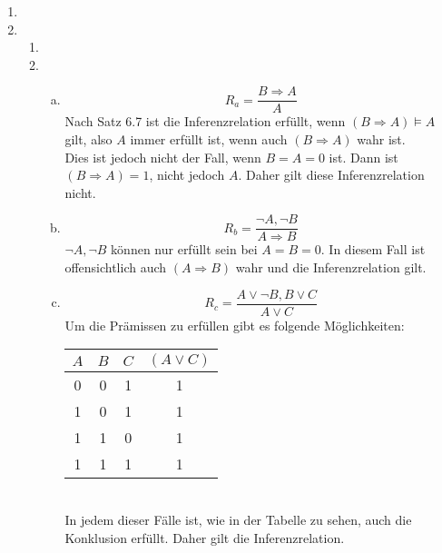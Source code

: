 \documentclass[a4paper,10pt]{scrartcl}
\title{\titleinfo}
\author{Arne Feil}
\date{\today}
\newcommand{\aufgabe}[1]{\item[\textbf{#1}]}
\begin{document}
\begin{enumerate}
\aufgabe{7.3}

\aufgabe{7.4}

\begin{enumerate}[1.]
 \item

 \item
  \begin{enumerate}[a)]
   \item
    $$R_a=\frac{B\Rightarrow A}{A}$$
    Nach Satz 6.7 ist die Inferenzrelation erfüllt, wenn $(B\Rightarrow A)\vDash A$ gilt, also $A$ immer erfüllt ist, wenn auch $(B\Rightarrow A)$ wahr ist.\\
    Dies ist jedoch nicht der Fall, wenn $B=A=0$ ist. Dann ist $(B\Rightarrow A)=1$, nicht jedoch $A$. Daher gilt diese Inferenzrelation nicht.
   \item
    $$R_b=\frac{\neg A,\neg B}{A\Rightarrow B}$$
    $\neg A, \neg B$ können nur erfüllt sein bei $A=B=0$. In diesem Fall ist offensichtlich auch $(A\Rightarrow B)$ wahr und die Inferenzrelation gilt.
   \item
    $$R_c=\frac{A\vee\neg B,B\vee C}{A\vee C}$$
    Um die Prämissen zu erfüllen gibt es folgende Möglichkeiten: \\
	\begin{tabular*}{0.27\textwidth}{ccc|c}
	 $A$&$B$&$C$&$(A\vee C)$ \\
	 \hline
	 0&0&1&1 \\
	 1&0&1&1 \\
	 1&1&0&1 \\
	 1&1&1&1
	\end{tabular*}\\
	In jedem dieser Fälle ist, wie in der Tabelle zu sehen, auch die Konklusion erfüllt. Daher gilt die Inferenzrelation.

  \end{enumerate}
\end{enumerate}



\end{enumerate}
\end{document}
